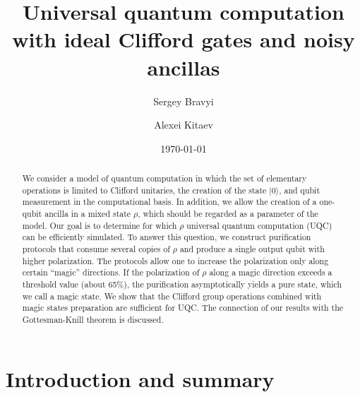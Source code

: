 \documentclass[pra,twocolumn,showpacs]{revtex4}
\begin{document}
\title{Universal quantum computation with ideal Clifford gates
and noisy ancillas}


\author{Sergey Bravyi}
\author{Alexei Kitaev}


\date{\today}


\begin{abstract}
We consider a model of quantum computation in which the set of elementary
operations is limited to Clifford unitaries, the creation of the state
$|0\rangle$, and qubit measurement in the computational basis. In addition, we
allow the creation of a one-qubit ancilla in a mixed state $\rho$, which
should be regarded as a parameter of the model. Our goal is to determine for
which $\rho$ universal quantum computation (UQC) can be efficiently
simulated. To answer this question, we construct purification protocols that
consume several copies of $\rho$ and produce a single output qubit with higher
polarization. The protocols allow one to increase the polarization only along
certain ``magic'' directions. If the polarization of $\rho$ along a magic
direction exceeds a threshold value (about 65\%), the purification
asymptotically yields a pure state, which we call a magic state.  We show that
the Clifford group operations combined with magic states preparation are
sufficient for UQC. The connection of our results with the Gottesman-Knill
theorem is discussed.
\end{abstract}




\maketitle

\section{\label{sec:intro} Introduction and summary}
\end{document}
